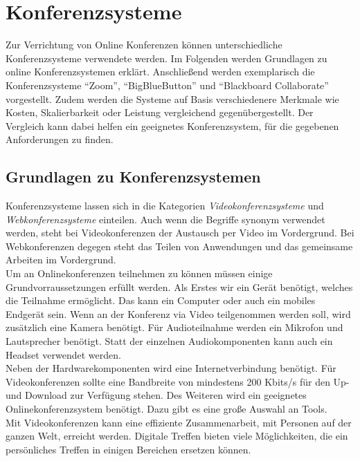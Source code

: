 \chapter{Konferenzsysteme}
Zur Verrichtung von Online Konferenzen können unterschiedliche Konferenzsysteme verwendete werden.
Im Folgenden werden Grundlagen zu online Konferenzsystemen erklärt.
Anschließend werden exemplarisch die Konferenzsysteme \enquote{Zoom}, \enquote{BigBlueButton} und \enquote{Blackboard Collaborate} vorgestellt.
Zudem werden die Systeme auf Basis verschiedenere Merkmale wie Kosten, Skalierbarkeit oder Leistung vergleichend gegenübergestellt.
Der Vergleich kann dabei helfen ein geeignetes Konferenzsystem, für die gegebenen Anforderungen zu finden.

\section{Grundlagen zu Konferenzsystemen}
Konferenzsysteme lassen sich in die Kategorien \textit{Videokonferenzsysteme} und \textit{Webkonferenzsysteme} einteilen.
\autocite[Vgl.][]{M_Straub.o.J.}
Auch wenn die Begriffe synonym verwendet werden, steht bei Videokonferenzen der Austausch per Video im Vordergrund.
Bei Webkonferenzen degegen steht das Teilen von Anwendungen und das gemeinsame Arbeiten im Vordergrund.
\autocite[Vgl.][]{M_Straub.o.J.}
\\
Um an Onlinekonferenzen teilnehmen zu können müssen einige Grundvorraussetzungen erfüllt werden.
Als Erstes wir ein Gerät benötigt, welches die Teilnahme ermöglicht.
Das kann ein Computer oder auch ein mobiles Endgerät sein.
Wenn an der Konferenz via Video teilgenommen werden soll, wird zusätzlich eine Kamera benötigt.
Für Audioteilnahme werden ein Mikrofon und Lautsprecher benötigt.
Statt der einzelnen Audiokomponenten kann auch ein Headset verwendet werden.
\autocite[Vgl.][]{M_Straub.o.J.}
\\
Neben der Hardwarekomponenten wird eine Internetverbindung benötigt.
Für Videokonferenzen sollte eine Bandbreite von mindestens 200 Kbits/s für den Up- und Download zur Verfügung stehen.
Des Weiteren wird ein geeignetes Onlinekonferenzsystem benötigt.
Dazu gibt es eine große Auswahl an Tools.
\autocite[Vgl.][]{M_Straub.o.J.}
\\
Mit Videokonferenzen kann eine effiziente Zusammenarbeit, mit Personen auf der ganzen Welt, erreicht werden.
Digitale Treffen bieten viele Möglichkeiten, die ein persönliches Treffen in einigen Bereichen ersetzen können.
\autocite[Vgl.][]{M_Mierke.2020}
